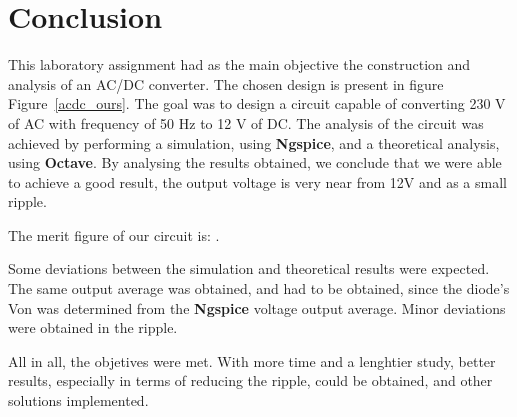 \section{Conclusion}
\label{sec:conclusion}

This laboratory assignment had as the main objective the construction and analysis of an AC/DC converter. The chosen design is present in figure Figure~\ref{acdc_ours}. The goal was to design a circuit capable of converting 230 V of AC with frequency of 50 Hz to 12 V of DC. The analysis of the circuit was achieved by performing a simulation, using {\bf Ngspice}, and a theoretical analysis, using {\bf Octave}. By analysing the results obtained, we conclude that we were able to achieve a good result, the output voltage is very near from 12V and as a small ripple. 

The merit figure of our circuit is: .



Some deviations between the simulation and theoretical results were expected. The same output average was obtained, and had to be obtained, since the diode's Von was determined from the {\bf Ngspice} voltage output average. Minor deviations were obtained in the ripple.

All in all, the objetives were met. With more time and a lenghtier study, better results, especially in terms of reducing the ripple, could be obtained, and other solutions implemented.
